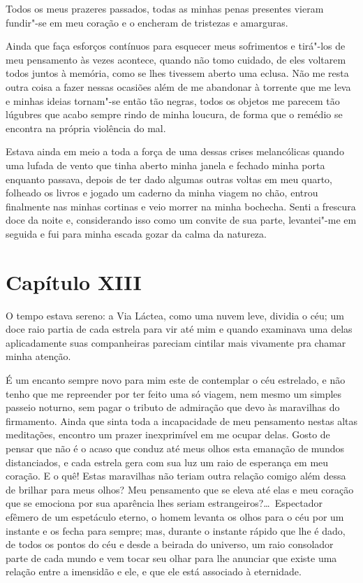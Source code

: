  Todos os meus prazeres passados, todas as minhas penas presentes vieram
fundir"-se em meu coração e o encheram de tristezas e amarguras.

 Ainda que faça esforços contínuos para esquecer meus sofrimentos e
tirá"-los de meu pensamento às vezes acontece, quando não tomo cuidado,
de eles voltarem todos juntos à memória, como se lhes tivessem aberto
uma eclusa. Não me resta outra coisa a fazer nessas ocasiões além de me
abandonar à torrente que me leva e minhas ideias tornam"-se então tão
negras, todos os objetos me parecem tão lúgubres que acabo sempre rindo
de minha loucura, de forma que o remédio se encontra na própria
violência do mal.

 Estava ainda em meio a toda a força de uma dessas crises melancólicas
quando uma lufada de vento que tinha aberto minha janela e fechado
minha porta enquanto passava, depois de ter dado algumas outras voltas
em meu quarto, folheado os livros e jogado um caderno da minha viagem
no chão, entrou finalmente nas minhas cortinas e veio morrer na minha
bochecha. Senti a frescura doce da noite e, considerando isso como um
convite de sua parte, levantei"-me em seguida e fui para minha escada
gozar da calma da natureza. 

 \section*{Capítulo XIII}

 O tempo estava sereno: a Via Láctea, como uma nuvem leve, dividia o
céu; um doce raio partia de cada estrela para vir até mim e quando
examinava uma delas aplicadamente suas companheiras pareciam cintilar
mais vivamente pra chamar minha atenção.

 É um encanto sempre novo para mim este de contemplar o céu estrelado, e
não tenho que me repreender por ter feito uma só viagem, nem mesmo um
simples passeio noturno, sem pagar o tributo de admiração que devo às
maravilhas do firmamento. Ainda que sinta toda a incapacidade de meu
pensamento nestas altas meditações, encontro um prazer inexprimível em
me ocupar delas. Gosto de pensar que não é o acaso que conduz até meus
olhos esta emanação de mundos distanciados, e cada estrela gera com sua
luz um raio de esperança em meu coração. E o quê! Estas maravilhas não
teriam outra relação comigo além dessa de brilhar para meus olhos? Meu
pensamento que se eleva até elas e meu coração que se emociona por sua
aparência lhes seriam estrangeiros?\ldots\ Espectador efêmero de um
espetáculo eterno, o homem levanta os olhos para o céu por um instante
e os fecha para sempre; mas, durante o instante rápido que lhe é dado,
de todos os pontos do céu e desde a beirada do universo, um raio
consolador parte de cada mundo e vem tocar seu olhar para lhe anunciar
que existe uma relação entre a imensidão e ele, e que ele está
associado à eternidade.

